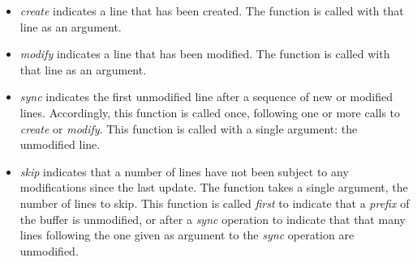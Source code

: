 \begin{itemize}
\item \textit{create} indicates a line that has been created.  The
  function is called with that line as an argument.
\item \textit{modify}%
  indicates a line that has been modified.  The
  function is called with that line as an argument.
\item \textit{sync} indicates the first unmodified line after a
  sequence of new or modified lines.  Accordingly, this function is
  called once, following one or more calls to \textit{create} or
  \textit{modify}.  This function is called with a single argument:
  the unmodified line.
\item \textit{skip} indicates that a number of lines have not been
  subject to any modifications since the last update.  The function
  takes a single argument, the number of lines to skip.  This function
  is called \emph{first} to indicate that a \emph{prefix} of the
  buffer is unmodified, or after a \emph{sync} operation to indicate
  that that many lines following the one given as argument to the
  \textit{sync} operation are unmodified.%
\end{itemize}

